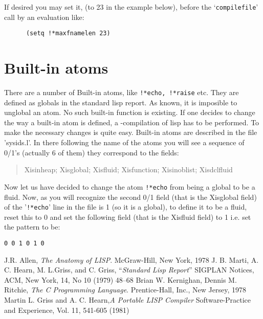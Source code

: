 If desired you may set it,
 (to 23 in the example below),
 before the `{\tt compilefile}' call by an evaluation like:
\begin{verbatim}
      (setq !*maxfnamelen 23)
\end{verbatim}


\section{Built-in atoms}

There are a number of Built-in atoms, like {\tt !*echo, !*raise} etc.
They are defined as globals in the standard lisp report. As known, it
is imposible to unglobal an atom.  No such built-in function is existing.
If one decides to change the way a built-in atom is defined, a \CC-compilation
of lisp has to be performed. To make the necessary changes is quite 
   easy. Built-in atoms are described in the file 'sysids.l'. In there
   following the name of the atoms you will see a sequence of 0/1's
   (actually 6 of them) they correspond to the fields:
\begin{quote}
      Xisinheap; Xisglobal; Xisfluid; Xisfunction; Xisinoblist; Xisdclfluid
\end{quote}
   Now let us have decided to change the atom {\tt !*echo} from being a global
  to be a fluid. Now,
   as you will recognize the second 0/1  field (that is the Xisglobal field) 
   of the '{\tt !*echo}' line in the file is
   1 (so it is a global), to define it to be a fluid,  reset this to 0 and
   set the following field (that is the Xisfluid field)
    to 1 i.e. set the pattern to be: 
\begin{verbatim}
0 0 1 0 1 0
\end{verbatim}
 

\begin{thebibliography}{9}
 J.R. Allen, {\em The Anatomy of LISP}. McGraw-Hill,
     New York, 1978
 J. B. Marti, A. C. Hearn, M. L.Griss, and C. Griss,
    ``{\em Standard Lisp Report}'' SIGPLAN Notices, ACM,
       New York, 14, No 10 (1979) 48--68
 Brian W. Kernighan, Dennis M. Ritchie, {\em The C Programming
   Language}. Prentice-Hall, Inc., New Jersey, 1978
 Martin L. Griss and A. C. Hearn,{\em A Portable LISP Compiler}
   Software-Practice and Experience, Vol. 11, 541-605 (1981)
\end{thebibliography}



